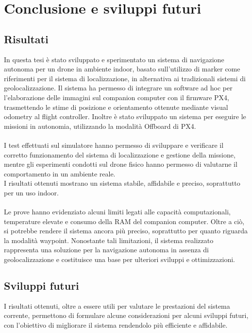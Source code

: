 \chapter{Conclusione e sviluppi futuri}
\label{chap:conclusione_sviluppi_futuri}

\section{Risultati}
In questa tesi è stato sviluppato e sperimentato un sistema di navigazione autonoma per un drone in ambiente indoor, basato sull'utilizzo di marker come riferimenti per il sistema di localizzazione, in alternativa ai tradizionali sistemi di geolocalizzazione. Il sistema ha permesso di integrare un software ad hoc per l'elaborazione delle immagini sul companion computer con il firmware PX4, trasmettendo le stime di posizione e orientamento ottenute mediante visual odometry al flight controller. Inoltre è stato sviluppato un sistema per eseguire le missioni in autonomia, utilizzando la modalità Offboard di PX4.\\ \\
I test effettuati sul simulatore hanno permesso di sviluppare e verificare il corretto funzionamento del sistema di localizzazione e gestione della missione, mentre gli esperimenti condotti sul drone fisico hanno permesso di valutarne il comportamento in un ambiente reale.\\
I risultati ottenuti mostrano un sistema stabile, affidabile e preciso, soprattutto per un uso indoor.\\ \\
Le prove hanno evidenziato alcuni limiti legati alle capacità computazionali, temperature elevate e consumo della RAM del companion computer. Oltre a ciò, si potrebbe rendere il sistema ancora più preciso, soprattutto per quanto riguarda la modalità waypoint. Nonostante tali limitazioni, il sistema realizzato rappresenta una soluzione per la navigazione autonoma in assenza di geolocalizzazione e costituisce una base per ulteriori sviluppi e ottimizzazioni.

\section{Sviluppi futuri}
I risultati ottenuti, oltre a essere utili per valutare le prestazioni del sistema corrente, permettono di formulare alcune considerazioni per alcuni sviluppi futuri, con l'obiettivo di migliorare il sistema rendendolo più efficiente e affidabile.

